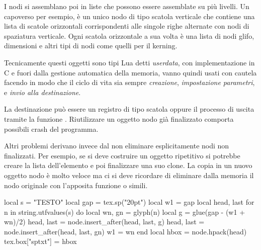 I nodi si assemblano poi in liste che possono essere assemblate su più livelli.
Un capoverso per esempio, è un unico nodo di tipo scatola verticale che contiene
una lista di scatole orizzontali corrispondenti alle singole righe alternate con
nodi di spaziatura verticale. Ogni scatola orizzontale a sua volta è una lista
di nodi glifo, dimensioni e altri tipi di nodi come quelli per il kerning.

Tecnicamente questi oggetti sono tipi Lua detti \emph{userdata}, con
implementazione in C e fuori dalla gestione automatica della memoria, vanno
quindi usati con cautela facendo in modo che il ciclo di vita sia sempre
\emph{creazione}, \emph{impostazione parametri}, e \emph{invio alla
destinazione}.

La destinazione può essere un registro di tipo scatola oppure il processo di
uscita tramite la funzione . Riutilizzare un oggetto nodo già
finalizzato comporta possibili crash del programma.

Altri problemi derivano invece dal non eliminare esplicitamente nodi non
finalizzati. Per esempio, se si deve costruire un oggetto ripetitivo si potrebbe
creare la lista dell'elemento e poi finalizzare una suo clone. La copia in un
nuovo oggetto nodo è molto veloce ma ci si deve ricordare di eliminare dalla
memoria il nodo originale con l'apposita funzione
 o simili.





\begin{lines}
local s = "TESTO"
local gap = tex.sp("20pt")
local w1 = gap
local head, last
for n in string.utfvalues(s) do
    local wn, gn = glyph(n)
    local g = glue(gap - (w1 + wn)/2)
    head, last = node.insert_after(head, last, g)
    head, last = node.insert_after(head, last, gn)
    w1 = wn
end
local hbox = node.hpack(head)
tex.box["sptxt"] = hbox
\end{lines}




